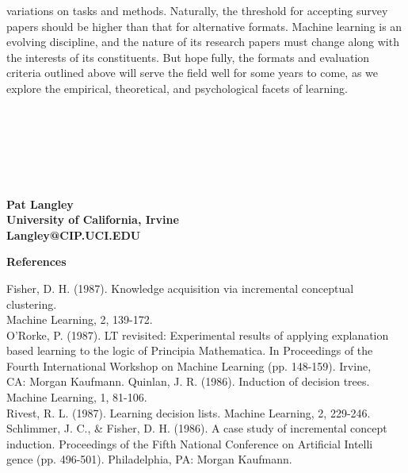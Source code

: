 \documentclass{article}
\begin{document}
variations on tasks and methods. Naturally, the threshold for accepting
survey papers should be higher than that for alternative formats.
Machine learning is an evolving discipline, and the nature of its research
papers must change along with the interests of its constituents. But hopefully, the formats and evaluation criteria outlined above will serve the field
well for some years to come, as we explore the empirical, theoretical, and
psychological facets of learning.

\\\\\\\\\

\begin{flushright}
\textbf{Pat Langley}\\
\textbf{University of California, Irvine}\\
\textbf{Langley@CIP.UCI.EDU}\\
\end{flushright}

\begin{flushleft}
\textbf{References}\\
\end{flushleft}

\begin{tiny}
Fisher, D. H. (1987). Knowledge acquisition via incremental conceptual clustering.\\
Machine Learning, 2, 139-172.\\
O'Rorke, P. (1987). LT revisited: Experimental results of applying explanation\\based learning to the logic of Principia Mathematica. In Proceedings of the\\
Fourth International Workshop on Machine Learning (pp. 148-159). Irvine,\\
CA: Morgan Kaufmann.
Quinlan, J. R. (1986). Induction of decision trees. Machine Learning, 1, 81-106.\\
Rivest, R. L. (1987). Learning decision lists. Machine Learning, 2, 229-246.\\
Schlimmer, J. C., & Fisher, D. H. (1986). A case study of incremental concept\\
induction. Proceedings of the Fifth National Conference on Artificial Intelli\\gence (pp. 496-501). Philadelphia, PA: Morgan Kaufmann.\\
\end{tiny}
\end{document}
